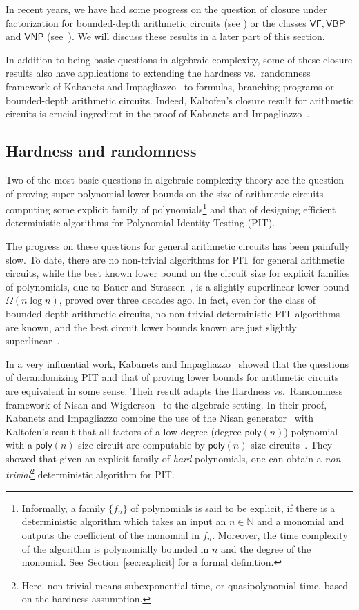 \documentclass[11pt]{article}
\numberwithin{equation}{section}
\theoremstyle{definition}
\theoremstyle{plain}
\newcommand{\N}{\mathbb N}
\newcommand{\expref}[2]{\hyperref[#2]{#1~\ref{#2}}}
\newcommand{\ComplexityFont}[1]{{\ensuremath{\mathsf{#1}}}}
\newcommand{\func}[1]{{\ensuremath{\mathsf{#1}}}}
\newcommand{\class}[1]{\ComplexityFont{#1}}
\newcommand{\VNP}{\ComplexityFont{VNP}}
\newcommand{\poly}{\func{poly}}
\begin{document}
In recent years, we have had some progress on the question of closure under factorization 
for
%
bounded-depth   %
arithmetic circuits (see \cite{DSY09, O16}) or the classes $\class{VF}, \class{VBP}$ and $\VNP$ (see~\cite{DSS17}). We will discuss these results in a later part of this section.

In addition to being basic questions in algebraic complexity, some of these closure results also have applications to extending the hardness
%
vs.\ randomness framework of Kabanets and Impagliazzo~\cite{ki03} to formulas, branching programs or
%
bounded-depth   %
arithmetic circuits. Indeed, Kaltofen's closure result for arithmetic circuits is crucial ingredient in the proof of Kabanets and Impagliazzo~\cite{ki03}. 

\subsection{Hardness and randomness}  %
%
Two of the most basic questions in algebraic complexity theory are the question of proving super-polynomial lower bounds on the size of arithmetic circuits computing some
%
explicit family of polynomials\footnote{Informally, a family $\{f_n\}$ of polynomials is said to be explicit, if there is a deterministic algorithm which takes an input an $n \in \N$ and a monomial and outputs the coefficient of the monomial in $f_n$. Moreover, the time complexity of the algorithm is polynomially bounded in $n$ and the degree of the monomial. See~\expref{Section}{sec:explicit} for a formal definition.}   %
%
and that of designing efficient deterministic algorithms for Polynomial Identity Testing (PIT). 

The progress on these questions for general arithmetic circuits has been painfully slow. To date, there are no non-trivial algorithms for PIT for general arithmetic circuits, while the best known lower bound
%
on the circuit size for explicit families of polynomials, %
due to Bauer and Strassen~\cite{BS83}, is a slightly superlinear lower bound $\Omega(n\log n)$, proved over three decades ago. In fact, even for the class of
%
bounded-depth   %
arithmetic circuits, no non-trivial deterministic PIT algorithms are known, and the best
circuit  %
lower bounds known are just slightly superlinear~\cite{Raz10a}. 

In a very influential work, Kabanets and Impagliazzo~\cite{ki03} showed that the questions of derandomizing PIT and that of proving lower bounds for arithmetic circuits are equivalent in some sense. Their result adapts the
Hardness vs.\ Randomness %
%
%
framework of Nisan and Wigderson~\cite{nw94} to the algebraic setting.
In their proof, Kabanets and Impagliazzo combine the use of
%
the Nisan generator~\cite{nisan1991}   %
with Kaltofen's result that all factors of a 
%
low-degree %
(degree $\poly(n)$) polynomial with
%
a $\poly(n)$-size circuit  %
are computable by
%
$\poly(n)$-size   %
circuits~\cite{k89}. They showed that given an explicit family of
\emph{hard} polynomials, one can obtain a \emph{non-trivial}\footnote{Here, non-trivial means subexponential time, or quasipolynomial time, based on the hardness assumption.} deterministic algorithm for PIT. 
\end{document}
